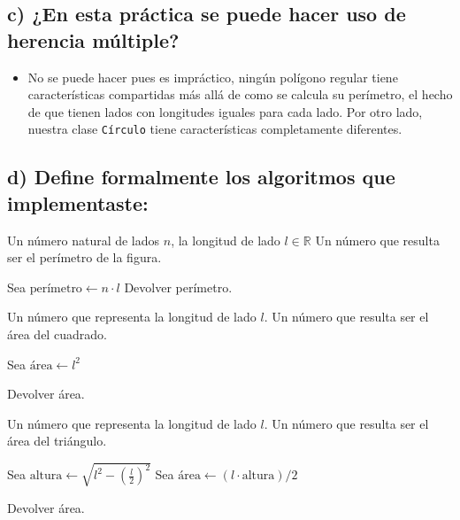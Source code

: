 \documentclass[12pt, letterpaper]{article}
\begin{document}
\subsection*{c) ¿En esta práctica se puede hacer uso de herencia múltiple?}
\begin{itemize}
  \item No se puede hacer pues es impráctico, ningún polígono regular tiene características compartidas más allá de como se calcula su perímetro, el hecho de que tienen lados con longitudes iguales para cada lado. Por otro lado, nuestra clase \texttt{Círculo} tiene características completamente 
    diferentes.
\end{itemize}

\subsection*{d) Define formalmente los algoritmos que implementaste:}

\begin{algorithm}
\caption{PerímetroPolígonoRegular}
\begin{algorithmic}[1] %
    
    \Require Un número natural de lados $n$, la longitud de lado $l \in \mathbb{R}$
    \Ensure Un número que resulta ser el perímetro de la figura.
    
    \State Sea $\text{perímetro} \leftarrow n \cdot l$
    \State Devolver perímetro.
    
\end{algorithmic}

\end{algorithm}

\begin{algorithm}
\caption{ÁreaCuadrado}
\begin{algorithmic}[1] 
    
    \Require Un número que representa la longitud de lado $l$.
    \Ensure Un número que resulta ser el área del cuadrado.
    
    \State Sea $\text{área} \leftarrow l^2$

    \State Devolver área.
    
\end{algorithmic}
\end{algorithm}

\begin{algorithm}
\caption{ÁreaTriánguloEquilátero}
\begin{algorithmic}[1] 
    
    \Require Un número que representa la longitud de lado $l$.
    \Ensure Un número  que resulta ser el área del triángulo.   

    \State Sea $\text{altura} \leftarrow \sqrt{l^2 - (\frac{l}{2})^2}$
    \State Sea $\text{área} \leftarrow (l \cdot \text{altura})/2$ 
    
    \State Devolver área.
    
\end{algorithmic}
\end{algorithm}
\end{document}
